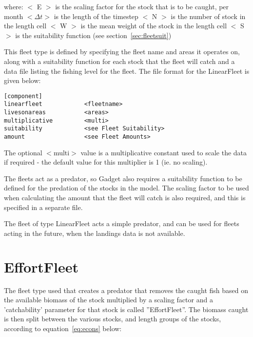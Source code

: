 \documentclass[10pt,twoside]{book}
\begin{document}
where:\newline
$<$ E $>$ is the scaling factor for the stock that is to be caught, per month\newline
$<\Delta t>$ is the length of the timestep\newline
$<$ N $>$ is the number of stock in the length cell\newline
$<$ W $>$ is the mean weight of the stock in the length cell\newline
$<$ S $>$ is the suitability function (see section~\ref{sec:fleetsuit})

\bigskip
This fleet type is defined by specifying the fleet name and areas it operates on, along with a suitability function for each stock that the fleet will catch and a data file listing the fishing level for the fleet.  The file format for the LinearFleet is given below:

{\small\begin{verbatim}
[component]
linearfleet            <fleetname>
livesonareas           <areas>
multiplicative         <multi>
suitability            <see Fleet Suitability>
amount                 <see Fleet Amounts>
\end{verbatim}}

The optional $<$multi$>$ value is a multiplicative constant used to scale the data if required - the default value for this multiplier is 1 (ie. no scaling).

\bigskip
The fleets act as a predator, so Gadget also requires a suitability function to be defined for the predation of the stocks in the model.  The scaling factor to be used when calculating the amount that the fleet will catch is also required, and this is specified in a separate file.

\bigskip
The fleet of type LinearFleet acts a simple predator, and can be used for fleets acting in the future, when the landings data is not available.

\section{EffortFleet}\label{sec:effortfleet}
The fleet type used that creates a predator that removes the caught fish based on the available biomass of the stock multiplied by a scaling factor and a 'catchability' parameter for that stock is called ''EffortFleet''.  The biomass caught is then split between the various stocks, and length groups of the stocks, according to equation~\ref{eq:econs} below:
\end{document}
